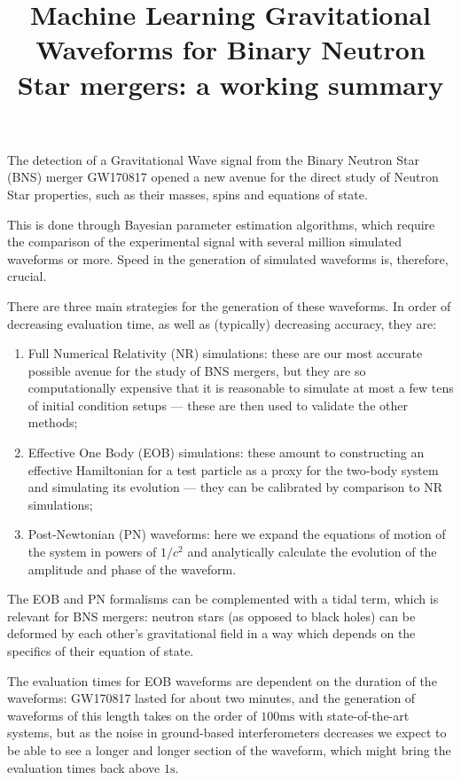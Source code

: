 \documentclass[11pt]{article}
\title{Machine Learning Gravitational Waveforms for Binary Neutron Star mergers: a working summary}
\begin{document}
\maketitle

The detection of a Gravitational Wave signal from the Binary Neutron Star (BNS) merger GW170817 \cite[]{abbottGW170817ObservationGravitational2017} opened a new avenue for the direct study of Neutron Star properties, such as their masses, spins and equations of state.

This is done through Bayesian parameter estimation algorithms, which require the comparison of the experimental signal with several million \cite{lackeyEffectiveonebodyWaveformsBinary2017} simulated waveforms or more.
Speed in the generation of simulated waveforms is, therefore, crucial.

There are three main strategies for the generation of these waveforms. In order of decreasing evaluation time, as well as (typically) decreasing accuracy, they are:
\begin{enumerate}
    \item Full Numerical Relativity (NR) simulations: these are our most accurate possible avenue for the study of BNS mergers, but they are so computationally expensive that it is reasonable to simulate at most a few tens of initial condition setups --- these are then used to validate the other methods;
    \item Effective One Body (EOB) simulations: these amount to constructing an effective Hamiltonian for a test particle as a proxy for the two-body system and simulating its evolution --- they can be calibrated by comparison to NR simulations;
    \item Post-Newtonian (PN) waveforms: here we expand the equations of motion of the system in powers of $1/c^2$ and analytically calculate the evolution of the amplitude and phase of the waveform.
\end{enumerate}

The EOB and PN formalisms can be complemented with a tidal term, which is relevant for BNS mergers: neutron stars (as opposed to black holes) can be deformed by each other's gravitational field in a way which depends on the specifics of their equation of state. 

The evaluation times for EOB waveforms are dependent on the duration of the waveforms: GW170817 lasted for about two minutes, and the generation of waveforms of this length takes on the order of $100\text{ms}$ with state-of-the-art systems, but as the noise in ground-based interferometers decreases we expect to be able to see a longer and longer section of the waveform, which might bring the evaluation times back above $1\text{s}$. 
\end{document}
